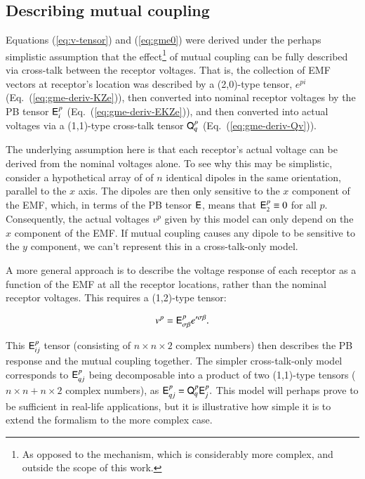 \documentclass{aa}
\begin{document}
\subsection{Describing mutual coupling}

Equations (\ref{eq:v-tensor}) and (\ref{eq:gme0}) were derived under the perhaps simplistic assumption that the effect\footnote{As opposed
to the mechanism, which is considerably more complex, and outside the scope of this work.} of mutual coupling can be fully described via cross-talk between the receptor voltages. That is, the collection of EMF vectors at receptor's location was described by a (2,0)-type tensor, $e^{pi}$ (Eq.~(\ref{eq:gme-deriv-KZe})), then converted into nominal receptor voltages by the PB tensor $\mathsf{E}^p_i$ (Eq.~(\ref{eq:gme-deriv-EKZe})), and then converted into actual voltages via a (1,1)-type cross-talk tensor $\mathsf{Q}^p_q$ (Eq.~(\ref{eq:gme-deriv-Qv})).

The underlying assumption here is that each receptor's actual voltage can be derived from the nominal voltages alone. To see why this may
be simplistic, consider a hypothetical array of of $n$ identical dipoles in the same orientation, parallel to the
$x$ axis. The dipoles are then only sensitive to the $x$ component of the EMF, which, in terms of the PB tensor $\mathsf{E}$, means that
$\mathsf{E}_{2}^{p}\equiv0$ for all $p$. Consequently, the actual voltages $v^{p}$ given by this model can only depend on the $x$ component of the EMF.
If mutual coupling causes any dipole to be sensitive to the $y$ component, we can't represent this in a cross-talk-only model.

A more general approach is to describe the voltage response of each receptor as a function of the EMF at all the receptor locations, rather than the
nominal receptor voltages. This requires a (1,2)-type tensor:

\[
v^{p}=\mathsf{E}_{\sigma\beta}^{p}e'^{\sigma\beta}.
\label{eq:v-tensor-gen}
\]

This $\mathsf{E}^p_{ij}$ tensor (consisting of $n\times n \times 2$ complex numbers) then describes the PB response and the mutual 
coupling together. The simpler cross-talk-only model corresponds to $\mathsf{E}^p_{qj}$ being decomposable into a product of two
(1,1)-type tensors ($n\times n+ n\times2$ complex numbers), as $\mathsf{E}_{qj}^{p}=\mathsf{Q}_q^p \mathsf{E}_j^p.$ This model will perhaps prove to be sufficient in real-life applications, but it is illustrative how simple it is to extend the formalism to the more complex case.
\end{document}
